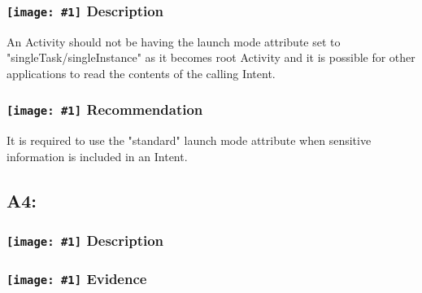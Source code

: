\documentclass[12p]{article}
\newcommand{\icon}[1]{\texttt{[image: \#1]}}
\begin{document}
\subsubsection*{\protect\icon{/home/miki/Documents/GITHUB/AndroidPermissions/python/vulns/report_icons/basic_sheet.png} Description}
An Activity should not be having the launch mode attribute set to "singleTask/singleInstance" as it becomes root Activity and it is possible for other applications to read the contents of the calling Intent.
\subsubsection*{\protect\icon{/home/miki/Documents/GITHUB/AndroidPermissions/python/vulns/report_icons/basic_todo.png} Recommendation}
It is required to use the "standard" launch mode attribute when sensitive information is included in an Intent.
\subsection{A4: }
\subsubsection*{\protect\icon{/home/miki/Documents/GITHUB/AndroidPermissions/python/vulns/report_icons/basic_sheet.png} Description}

\subsubsection*{\protect\icon{/home/miki/Documents/GITHUB/AndroidPermissions/python/vulns/report_icons/basic_magnifier.png} Evidence}



\end{document}
